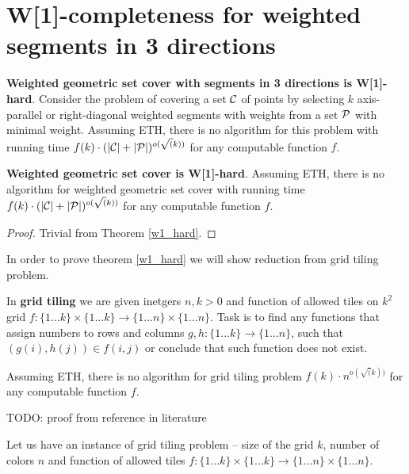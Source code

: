 \section{W[1]-completeness for weighted segments in 3 directions}

\begin{tw}
\label{w1_hard}
	\textbf{Weighted geometric set cover with segments in 3 directions is W[1]-hard}.
	Consider the problem of covering a set $\mathcal{C}$ of points
	by selecting $k$ axis-parallel or right-diagonal weighted segments
	with weights
	from a set $\mathcal{P}$ with minimal weight.
	Assuming ETH, there is no algorithm for this
	problem with running time
	$f(k)\cdot(|\mathcal{C}| + |\mathcal{P}|)^{o(\sqrt(k))}$
	for any computable function $f$.
\end{tw}

\begin{corollary}
	\textbf{Weighted geometric set cover is W[1]-hard}.
	Assuming ETH, there is no algorithm for weighted geometric set cover
	with running time
	$f(k)\cdot(|\mathcal{C}| + |\mathcal{P}|)^{o(\sqrt(k))}$
	for any computable function $f$.
\end{corollary}

\begin{proof}
Trivial from Theorem \ref{w1_hard}. 
\end{proof}

In order to prove theorem \ref{w1_hard} we will show reduction from grid tiling problem.

\begin{defi}
In \textbf{grid tiling} we are given inetgers $n, k > 0$
and function of allowed tiles on $k^2$ grid
$f : \{1 \ldots k\} \times \{1 \ldots k\} \rightarrow \{1 \ldots n\} \times \{1 \ldots n\}$.
Task is to find any functions that assign numbers to rows and columns
$g,h : \{1 \ldots k\} \rightarrow \{1 \ldots n\}$,
such that $(g(i), h(j)) \in f(i, j)$ or conclude that such function
does not exist.
\end{defi}


\begin{tw}
\label{grid_tiling_w1_hard}
Assuming ETH, there is no algorithm for grid tiling problem
$f(k)\cdot n^{o(\sqrt(k))}$
for any computable function $f$.
\end{tw}

TODO: proof from reference in literature

Let us have an instance of grid tiling problem -- size of the
grid $k$, number of colors $n$
and function of allowed tiles
$f : \{1 \ldots k\} \times \{1 \ldots k\} \rightarrow \{1 \ldots n\} \times \{1 \ldots n\}$.

